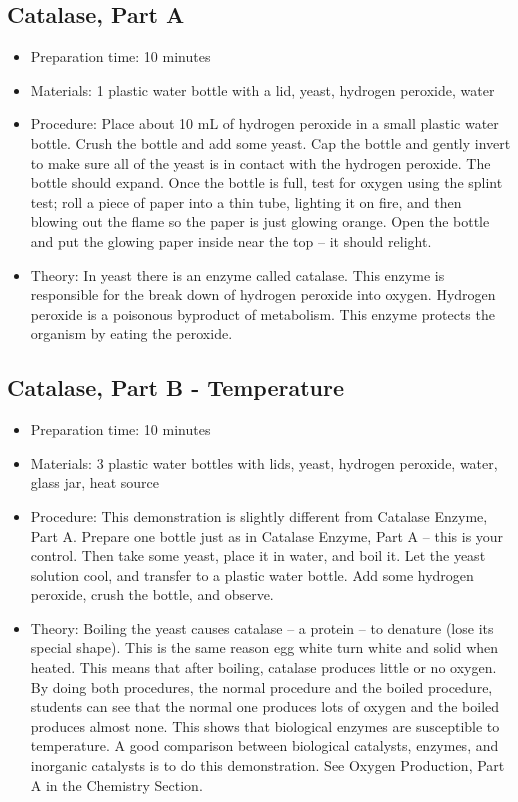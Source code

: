 \subsection{Catalase, Part A}
\begin{itemize}
\item{Preparation time: 10 minutes}
\item{Materials: 1 plastic water bottle with a lid, yeast, hydrogen peroxide, water}
\item{Procedure: Place about 10 mL of hydrogen peroxide in a small plastic water bottle. Crush the bottle and add some yeast. Cap the bottle and gently invert to make sure all of the yeast is in contact with the hydrogen peroxide. The bottle should expand. Once the bottle is full, test for oxygen using the splint test; roll a piece of paper into a thin tube, lighting it on fire, and then blowing out the flame so the paper is just glowing orange. Open the bottle and put the glowing paper inside near the top – it should relight.}
\item{Theory: In yeast there is an enzyme called catalase. This enzyme is responsible for the break down of hydrogen peroxide into oxygen. Hydrogen peroxide is a poisonous byproduct of metabolism. This enzyme protects the organism by eating the peroxide.}
\end{itemize}

\subsection{Catalase, Part B - Temperature}
\begin{itemize}
\item{Preparation time: 10 minutes}
\item{Materials: 3 plastic water bottles with lids, yeast, hydrogen peroxide, water, glass jar, heat source}
\item{Procedure: This demonstration is slightly different from Catalase Enzyme, Part A. Prepare one bottle just as in Catalase Enzyme, Part A – this is your control. Then take some yeast, place it in water, and boil it. Let the yeast solution cool, and transfer to a plastic water bottle. Add some hydrogen peroxide, crush the bottle, and observe.}
\item{Theory: Boiling the yeast causes catalase – a protein – to denature (lose its special shape). This is the same reason egg white turn white and solid when heated. This means that after boiling, catalase produces little or no oxygen. By doing both procedures, the normal procedure and the boiled procedure, students can see that the normal one produces lots of oxygen and the boiled produces almost none. This shows that biological enzymes are susceptible to temperature. A good comparison between biological catalysts, enzymes, and inorganic catalysts is to do this demonstration. See Oxygen Production, Part A in the Chemistry Section.}
\end{itemize}

